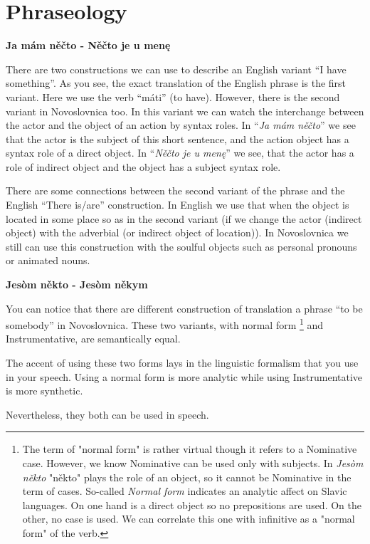 \section{Phraseology}

\textbf{Ja mám něčto - Něčto je u menę}

There are two constructions we can use to describe an English variant “I have something”.
As you see, the exact translation of the English phrase is the first variant. Here we use the verb “máti” (to have). However, there is the second variant in Novoslovnica too. In this variant we can watch the interchange between the actor and the object of an action by syntax roles. In “\textit{Ja mám něčto}” we see that the actor is the subject of this short sentence, and the action object has a syntax role of a direct object. In “\textit{Něčto je u menę}” we see, that the actor has a role of indirect object and the object has a subject syntax role.    

There are some connections between the second variant of the phrase and the English “There is/are” construction. In English we use that when the object is located in some place so as in the second variant (if we change the actor (indirect object) with the adverbial (or indirect object of location)). In Novoslovnica we still can use this construction with the soulful objects such as personal pronouns or animated nouns. 

\textbf{Jesòm někto - Jesòm někym}

You can notice that there are different construction of translation a phrase “to be somebody” in Novoslovnica. These two variants, with normal form \footnote{The term of "normal form" is rather virtual though it refers to a Nominative case. However, we know Nominative can be used only with subjects. In \textit{Jesòm někto} "někto" plays the role of an object, so it cannot be Nominative in the term of cases. So-called \textit{Normal form} indicates an analytic affect on Slavic languages. On one hand is a direct object so no prepositions are used. On the other, no case is used. We can correlate this one with infinitive as a "normal form" of the verb.} and Instrumentative, are semantically equal. 

The accent of using these two forms lays in the linguistic formalism that you use in your speech. Using a normal form is more analytic while using Instrumentative is more synthetic.

Nevertheless, they both can be used in speech.
